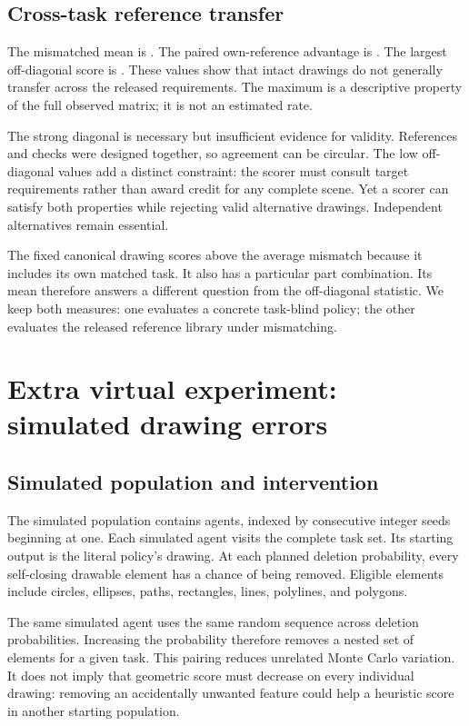 \documentclass{article}
\begin{document}
\subsection{Cross-task reference transfer}
The mismatched mean is \crossMean{}. The paired own-reference advantage is \crossGain{}. The largest off-diagonal score is \crossMax{}. These values show that intact drawings do not generally transfer across the released requirements. The maximum is a descriptive property of the full observed matrix; it is not an estimated rate.


The strong diagonal is necessary but insufficient evidence for validity. References and checks were designed together, so agreement can be circular. The low off-diagonal values add a distinct constraint: the scorer must consult target requirements rather than award credit for any complete scene. Yet a scorer can satisfy both properties while rejecting valid alternative drawings. Independent alternatives remain essential.

The fixed canonical drawing scores above the average mismatch because it includes its own matched task. It also has a particular part combination. Its mean therefore answers a different question from the off-diagonal statistic. We keep both measures: one evaluates a concrete task-blind policy; the other evaluates the released reference library under mismatching.

\section{Extra virtual experiment: simulated drawing errors}
\subsection{Simulated population and intervention}
The simulated population contains \simAgents{} agents, indexed by consecutive integer seeds beginning at one. Each simulated agent visits the complete task set. Its starting output is the literal policy's drawing. At each planned deletion probability, every self-closing drawable element has a chance of being removed. Eligible elements include circles, ellipses, paths, rectangles, lines, polylines, and polygons.

The same simulated agent uses the same random sequence across deletion probabilities. Increasing the probability therefore removes a nested set of elements for a given task. This pairing reduces unrelated Monte Carlo variation. It does not imply that geometric score must decrease on every individual drawing: removing an accidentally unwanted feature could help a heuristic score in another starting population.
\end{document}

